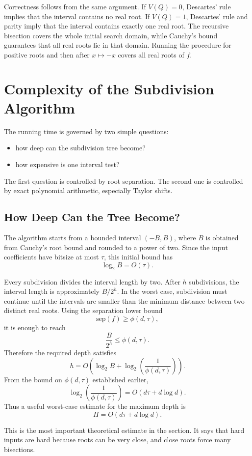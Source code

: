 \documentclass[letterpaper]{article}
\newcommand{\sep}{\mathrm{sep}}
\begin{document}
Correctness follows from the same argument. If $V(Q)=0$, Descartes' rule
implies that the interval contains no real root. If $V(Q)=1$, Descartes' rule
and parity imply that the interval contains exactly one real root. The
recursive bisection covers the whole initial search domain, while Cauchy's
bound guarantees that all real roots lie in that domain. Running the procedure
for positive roots and then after $x\mapsto -x$ covers all real roots of $f$.

\section{Complexity of the Subdivision Algorithm}

The running time is governed by two simple questions:
\begin{itemize}
  \item how deep can the subdivision tree become?
  \item how expensive is one interval test?
\end{itemize}
The first question is controlled by root separation. The second one is
controlled by exact polynomial arithmetic, especially Taylor shifts.

\subsection{How Deep Can the Tree Become?}

The algorithm starts from a bounded interval $(-B,B)$, where $B$ is obtained
from Cauchy's root bound and rounded to a power of two. Since the input
coefficients have bitsize at most $\tau$, this initial bound has
\[
  \log_2 B = O(\tau).
\]

Every subdivision divides the interval length by two. After $h$ subdivisions,
the interval length is approximately $B/2^h$. In the worst case, subdivision
must continue until the intervals are smaller than the minimum distance
between two distinct real roots. Using the separation lower bound
\[
  \sep(f)\geq \phi(d,\tau),
\]
it is enough to reach
\[
  \frac{B}{2^h}\leq \phi(d,\tau).
\]
Therefore the required depth satisfies
\[
  h = O\!\left(\log_2 B+\log_2\!\left(\frac{1}{\phi(d,\tau)}\right)\right).
\]
From the bound on $\phi(d,\tau)$ established earlier,
\[
  \log_2\!\left(\frac{1}{\phi(d,\tau)}\right)
  = O(d\tau+d\log d).
\]
Thus a useful worst-case estimate for the maximum depth is
\[
  H = O(d\tau+d\log d).
\]

This is the most important theoretical estimate in the section. It says that
hard inputs are hard because roots can be very close, and close roots force
many bisections.
\end{document}
